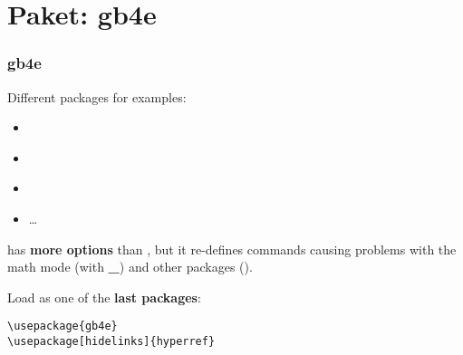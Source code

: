\section{Paket: gb4e}

\begin{frame}[fragile]
\frametitle{gb4e}

Different packages for examples:

\begin{itemize}
	\item {}
	\item \alert{}
	\item \alert{}
	\item \dots 
\end{itemize}

 has \textbf{more options} than  , but it re-defines commands causing problems with the math mode (with \textbf{\_}) and other packages (\fe {}).

\bigskip

Load  as one of the \textbf{last packages}:


\begin{lstlisting}
\usepackage{gb4e}
\usepackage[hidelinks]{hyperref}
\end{lstlisting}

\end{frame}


